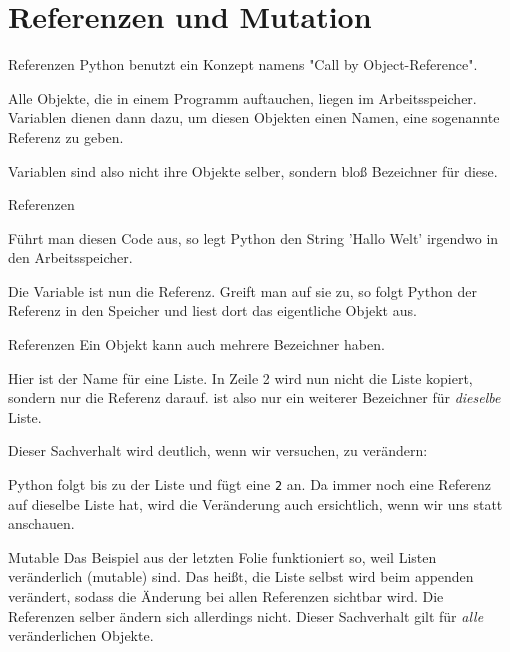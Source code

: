 \section{Referenzen und Mutation}
\begin{frame}{Referenzen}
	Python benutzt ein Konzept namens \alert{"Call by Object-Reference"}. 
	
	Alle Objekte, die in einem Programm auftauchen, liegen im Arbeitsspeicher. Variablen dienen dann dazu, um diesen Objekten einen Namen, eine sogenannte \alert{Referenz} zu geben. 
	
	Variablen sind also nicht ihre Objekte selber, sondern bloß Bezeichner für diese.
\end{frame}

\begin{frame}{Referenzen}
	
	Führt man diesen Code aus, so legt Python den String 'Hallo Welt' irgendwo in den Arbeitsspeicher. 
	
	Die Variable  ist nun die Referenz. Greift man auf sie zu, so folgt Python der Referenz in den Speicher und liest dort das eigentliche Objekt aus.
\end{frame}

\begin{frame}{Referenzen}
	Ein Objekt kann auch mehrere Bezeichner haben.
	
	Hier ist  der Name für eine Liste. In Zeile 2 wird nun nicht die Liste kopiert, sondern nur die Referenz darauf.  ist also nur ein weiterer Bezeichner für \textit{dieselbe} Liste.
	
	Dieser Sachverhalt wird deutlich, wenn wir versuchen,  zu verändern:
	
	Python folgt  bis zu der Liste und fügt eine \texttt{2} an. Da  immer noch eine Referenz auf dieselbe Liste hat, wird die Veränderung auch ersichtlich, wenn wir uns  statt  anschauen.
\end{frame}

\begin{frame}{Mutable}
	Das Beispiel aus der letzten Folie funktioniert so, weil Listen veränderlich (mutable) sind. Das heißt, die Liste selbst wird beim appenden verändert, sodass die Änderung bei allen Referenzen sichtbar wird. \alert{Die Referenzen selber ändern sich allerdings nicht.} Dieser Sachverhalt gilt für \textit{alle} veränderlichen Objekte.
\end{frame}

